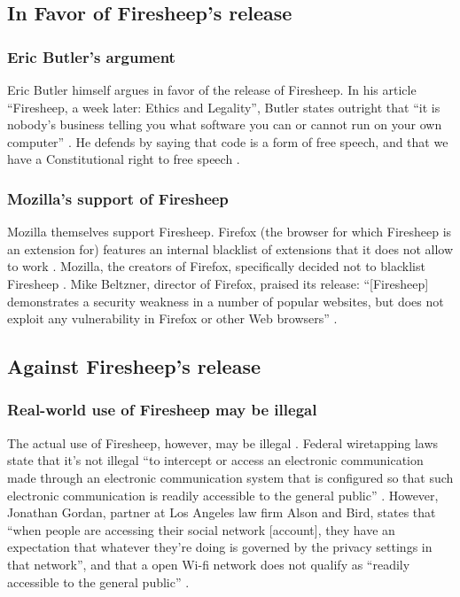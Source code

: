 \documentclass[12pt]{article}
\begin{document}
\subsection{In Favor of Firesheep's release}
\subsubsection{Eric Butler's argument}
Eric Butler himself argues in favor of the release of Firesheep. In his article ``Firesheep, a week later: Ethics and Legality'', Butler states outright that ``it is nobody's business telling you what software you can or cannot run on your own computer'' \cite{butler-week-later}. He defends by saying that code is a form of free speech, and that we have a Constitutional right to free speech \cite{butler-week-later}.

\subsubsection{Mozilla's support of Firesheep}
Mozilla themselves support Firesheep. Firefox (the browser for which Firesheep is an extension for) features an internal blacklist of extensions that it does not allow to work \cite{mozilla-blocklist}. Mozilla, the creators of Firefox, specifically decided not to blacklist Firesheep \cite{no-kill-switch}. Mike Beltzner, director of Firefox, praised its release: ``[Firesheep] demonstrates a security weakness in a number of popular websites, but does not exploit any vulnerability in Firefox or other Web browsers'' \cite{no-kill-switch}.


\subsection{Against Firesheep's release}
\subsubsection{Real-world use of Firesheep may be illegal}
The actual use of Firesheep, however, may be illegal \cite{illegal-to-use-firesheep}. Federal wiretapping laws state that it's not illegal ``to intercept or access an electronic communication made through an electronic communication system that is configured so that such electronic communication is readily accessible to the general public'' \cite{illegal-to-use-firesheep}. However, Jonathan Gordan, partner at Los Angeles law firm Alson and Bird, states that ``when people are accessing their social network [account], they have an expectation that whatever they're doing is governed by the privacy settings in that network'', and that a open Wi-fi network does not qualify as ``readily accessible to the general public'' \cite{illegal-to-use-firesheep}.
\end{document}
